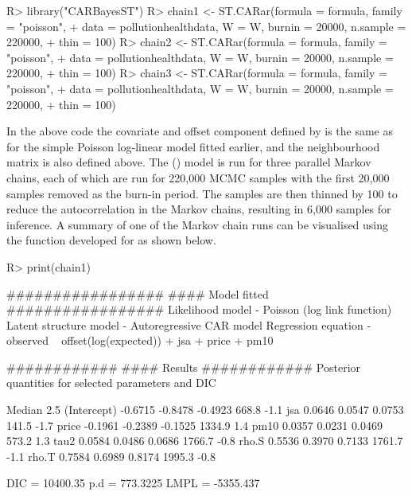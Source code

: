 \documentclass[article, nojss]{jss}
\begin{document}
\begin{CodeInput}
R>  library("CARBayesST")
R>  chain1 <- ST.CARar(formula = formula, family = "poisson", 
+       data = pollutionhealthdata, W = W, burnin = 20000, n.sample = 220000, 
+       thin = 100)
R>  chain2 <- ST.CARar(formula = formula, family = "poisson", 
+       data = pollutionhealthdata, W = W, burnin = 20000, n.sample = 220000, 
+       thin = 100)
R>  chain3 <- ST.CARar(formula = formula, family = "poisson", 
+       data = pollutionhealthdata, W = W, burnin = 20000, n.sample = 220000, 
+       thin = 100)
\end{CodeInput}


In the above code the covariate and offset component defined by  is the same as for the simple Poisson log-linear model fitted earlier, and the neighbourhood matrix   is also defined above. The () model is run for three parallel Markov chains, each of which  are run for 220,000 MCMC samples with the first 20,000 samples removed as the burn-in period. The samples are then thinned by 100 to reduce the autocorrelation in the Markov chains, resulting in 6,000 samples for inference. A summary of one of the Markov chain runs can be visualised using the  function developed for  as shown below.

\begin{CodeInput}
R>  print(chain1)
\end{CodeInput}


\begin{CodeOutput}
#################
#### Model fitted
#################
Likelihood model - Poisson (log link function) 
Latent structure model - Autoregressive CAR model
Regression equation - observed ~ offset(log(expected)) + jsa + price + pm10

############
#### Results
############
Posterior quantities for selected parameters and DIC

             Median    2.5%
(Intercept) -0.6715 -0.8478 -0.4923       668.8        -1.1
jsa          0.0646  0.0547  0.0753       141.5        -1.7
price       -0.1961 -0.2389 -0.1525      1334.9         1.4
pm10         0.0357  0.0231  0.0469       573.2         1.3
tau2         0.0584  0.0486  0.0686      1766.7        -0.8
rho.S        0.5536  0.3970  0.7133      1761.7        -1.1
rho.T        0.7584  0.6989  0.8174      1995.3        -0.8

DIC =  10400.35       p.d =  773.3225       LMPL =  -5355.437 \end{CodeOutput}
\end{document}
